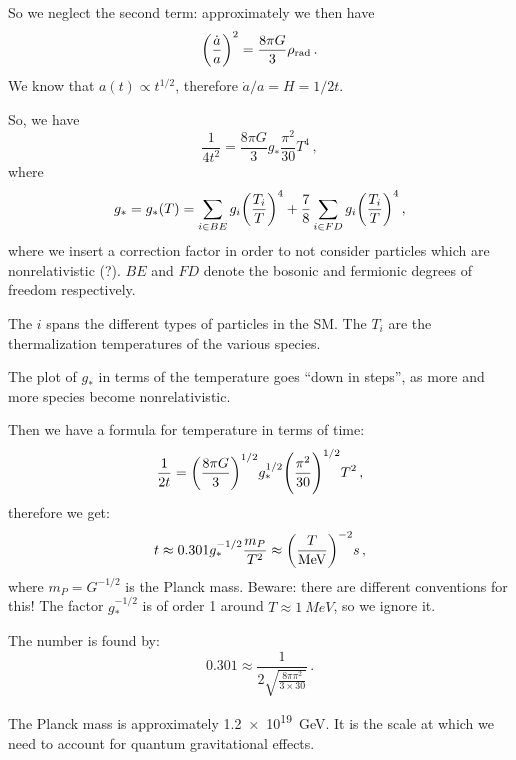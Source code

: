 \documentclass[main.tex]{subfiles}
\begin{document}
So we neglect the second term: approximately we then have 
%
\begin{equation}
  \qty(\frac{\dot{a } }{a})^2 = \frac{8 \pi  G }{3} \rho _{\text{rad}}
\,.
\end{equation}
%
We know that \(a(t) \propto t^{1/2}\), therefore \(\dot{a} / a = H = 1/2t\). 


So, we have 
%
\begin{equation}
  \frac{1}{4 t^2} = \frac{8 \pi G}{3} g_{*} \frac{\pi^2}{30} T^{4}
\,,
\end{equation}
%
where 
%
\begin{equation}
  g_{*} = g_{*}(T) = \sum _{i \in BE } g_i \qty(\frac{T_{i}}{T})^{4} + \frac{7}{8} \sum _{i \in FD } g_i \qty(\frac{T_{i}}{T})^{4}
\,,
\end{equation}
%
where we insert a correction factor in order to not consider particles which are nonrelativistic (?).
\(BE\) and \(FD\) denote the bosonic and fermionic degrees of freedom respectively.

The \(i\) spans the different types of particles in the SM.
The \(T_i\) are the thermalization temperatures of the various species.

The plot of \(g_{*}\) in terms of the temperature goes ``down in steps'', as more and more species become nonrelativistic.

Then we have a formula for temperature in terms of time: 
%
\begin{equation}
  \frac{1}{2t} = \qty(\frac{8 \pi G}{3})^{1/2} g_{*}^{1/2} \qty(\frac{\pi^2}{30})^{1/2} T^2
\,,
\end{equation}
%
therefore we get: 
%
\begin{equation}
  t \approx 0.301 g_{*}^{-1/2} \frac{m_P}{T^2} \approx \qty(\frac{T}{\SI{}{MeV}})^{-2}s
\,,
\end{equation}
%
where \(m_P  = G^{-1/2}\) is the Planck mass. Beware: there are different conventions for this!
The factor \(g_{*}^{-1/2}\) is of order 1 around \(T \approx \SI{1}{MeV}\), so we ignore it.

The number is found by:
%
\begin{equation}
  0.301 \approx \frac{1}{2 \sqrt{\frac{8 \pi \pi^2}{3 \times 30}}}
\,.
\end{equation}
%

The Planck mass is approximately \SI{1.2e19}{GeV}.
It is the scale at which we need to account for quantum gravitational effects.
\end{document}
